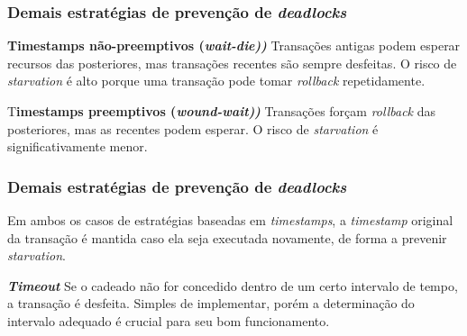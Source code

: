 \documentclass{beamer}
\begin{document}
\begin{frame}
    \frametitle{Demais estratégias de prevenção de \emph{deadlocks}}
    
    \begin{block}{\textbf{Timestamps não-preemptivos (\emph{wait-die))}}}
        Transações antigas podem esperar recursos das posteriores, mas transações recentes são sempre desfeitas. O risco de \emph{starvation} é alto porque uma transação pode tomar \emph{rollback} repetidamente.
    \end{block}

    \medskip
    \begin{block}{T\textbf{imestamps preemptivos (\emph{wound-wait))}}}
        Transações forçam \emph{rollback} das posteriores, mas as recentes podem esperar. O risco de \emph{starvation} é significativamente menor.
    \end{block}

\end{frame}


\begin{frame}
    \frametitle{Demais estratégias de prevenção de \emph{deadlocks}}

    Em ambos os casos de estratégias baseadas em \emph{timestamps}, a \emph{timestamp} original da transação é mantida caso ela seja executada novamente, de forma a prevenir \emph{starvation}.

    \medskip
    \begin{block}{\textbf{\emph{Timeout}}}
        Se o cadeado não for concedido dentro de um certo intervalo de tempo, a transação é desfeita. Simples de implementar, porém a determinação do intervalo adequado é crucial para seu bom funcionamento.
    \end{block}
    
\end{frame}


\end{document}
